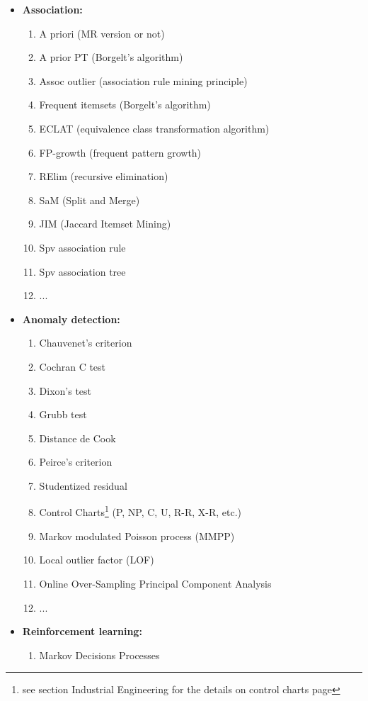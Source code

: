 \begin{itemize}
\begin{enumerate}
			\item ...
		\end{enumerate}
		\item \textbf{Association:}
		\begin{enumerate}
			\item A priori (MR version or not)
			\item A prior PT (Borgelt's algorithm)
			\item Assoc outlier (association rule mining principle)
			\item Frequent itemsets (Borgelt's algorithm)
			\item ECLAT (equivalence class transformation algorithm)
			\item FP-growth (frequent pattern growth)
			\item RElim (recursive elimination)
			\item SaM (Split and Merge)
			\item JIM (Jaccard Itemset Mining)
			\item Spv association rule 
			\item Spv association tree
			\item ...
		\end{enumerate}
		\item \textbf{Anomaly detection:}
		\begin{enumerate}
			\item Chauvenet's criterion
			\item Cochran C test
			\item Dixon's test
			\item Grubb test
			\item Distance de Cook
			\item Peirce's criterion
			\item Studentized residual
			\item Control Charts\footnote{see section Industrial Engineering for the details on control charts page \pageref{quality control charts}} (P, NP, C, U, R-R, X-R, etc.)
			\item Markov modulated Poisson process
(MMPP)
			\item Local outlier factor (LOF)
			\item Online Over-Sampling Principal Component Analysis
			\item ...
		\end{enumerate}
		\item \textbf{Reinforcement learning:}
		\begin{enumerate}
			\item Markov Decisions Processes

\end{enumerate}
\end{itemize}
